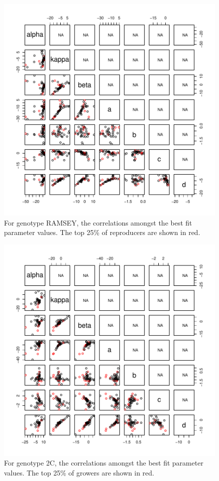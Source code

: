 \documentclass[12pt,reqno,final]{amsart}
\theoremstyle{plain}
\numberwithin{equation}{part}
\begin{document}
\begin{figure}
\includegraphics{Comparing_best_fit_parameters_against_Adriana_winners_and_losers-006}
\caption{For genotype RAMSEY, the correlations amongst the best fit
  parameter values. The top 25\% of reproducers are shown in red.}
\end{figure}

\begin{figure}
\includegraphics{Comparing_best_fit_parameters_against_Adriana_winners_and_losers-007}
\caption{For genotype 2C, the correlations amongst the best fit
  parameter values. The top 25\% of growers are shown in red.}
\end{figure}
\end{document}
